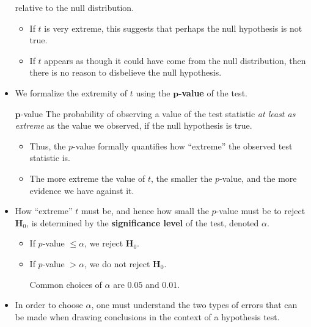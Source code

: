 \begin{itemize}
          relative to the null distribution.
          \begin{itemize}
              \item If $ t $ is very extreme, this suggests that perhaps the null hypothesis
                    is not true.
              \item If $ t $ appears as though it could have come from the null distribution, then
                    there is no reason to disbelieve the null hypothesis.
          \end{itemize}
    \item We formalize the extremity of $ t $ using the \textbf{$ \symbf{p} $-value} of the test.

          \begin{Definition}{$ \symbf{p} $-value}{}
              The probability of observing a value of the test statistic \emph{at least as extreme}
              as the value we observed, if the null hypothesis is true.
          \end{Definition}
          \begin{itemize}
              \item Thus, the $ p $-value formally quantifies how ``extreme'' the observed
                    test statistic is.
              \item The more extreme the value of $ t $, the smaller the $ p $-value, and the more
                    evidence we have against it.
          \end{itemize}
    \item How ``extreme'' $ t $ must be, and hence how small the $ p $-value must be
          to reject $ \mathbf{H}_0 $, is determined by the \textbf{significance level} of the test,
          denoted $ \alpha $.
          \begin{itemize}
              \item If $ p $-value $ \le \alpha $, we reject $ \mathbf{H}_0 $.
              \item If $ p $-value $ >\alpha $, we do not reject $ \mathbf{H}_0 $.
                    \begin{Remark}{}{}
                        Common choices of $ \alpha $ are $ 0.05 $ and $ 0.01 $.
                    \end{Remark}
          \end{itemize}
    \item In order to choose $ \alpha $, one must understand the two types of errors
          that can be made when drawing conclusions in the context of a hypothesis test.

\end{itemize}
